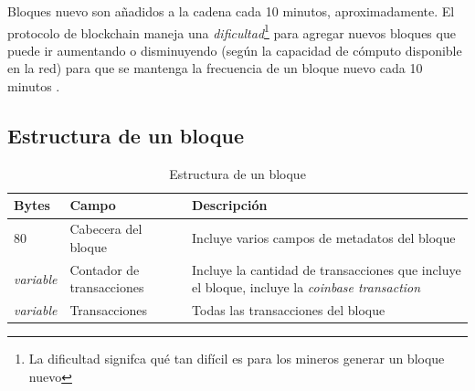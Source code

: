 Bloques nuevo son añadidos a la cadena cada 10 minutos, aproximadamente. El protocolo de blockchain maneja una \emph{dificultad}\footnote{La dificultad signifca qué tan difícil es para los mineros generar un bloque nuevo} para agregar nuevos bloques que puede ir aumentando o disminuyendo (según la capacidad de cómputo disponible en la red) para que se mantenga la frecuencia de un bloque nuevo cada 10 minutos \autocite{MasteringBlockchainBlockchain}.

\subsection{Estructura de un bloque}

\begin{table}[H]
    \begin{center}
        \begin{tabular}{ | l | l | p{8cm} | }
            \hline
            \textbf{Bytes} & \textbf{Campo} & \textbf{Descripción}  \\
            \hline
            80 & Cabecera del bloque & Incluye varios campos de metadatos del bloque \\
            \hline
            \emph{variable} & Contador de transacciones & Incluye la cantidad de transacciones que incluye el bloque, incluye la \emph{coinbase transaction} \\
            \hline
            \emph{variable} & Transacciones & Todas las transacciones del bloque \\
            \hline
        \end{tabular}
        \caption*{Estructura de un bloque \autocite{MasteringBlockchainBlockStructure}}
    \end{center}
\end{table}

